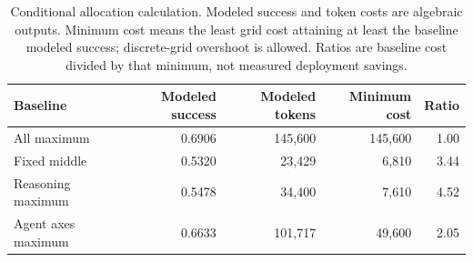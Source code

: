 \begin{table}[t]
\centering\small
\caption{Conditional allocation calculation. Modeled success and token costs are algebraic outputs. Minimum cost means the least grid cost attaining at least the baseline modeled success; discrete-grid overshoot is allowed. Ratios are baseline cost divided by that minimum, not measured deployment savings.}
\label{tab:allocation}
\begin{tabular}{lrrrr}
\toprule
Baseline & Modeled success & Modeled tokens & Minimum cost & Ratio \\
\midrule
All maximum & 0.6906 & 145,600 & 145,600 & 1.00 \\
Fixed middle & 0.5320 & 23,429 & 6,810 & 3.44 \\
Reasoning maximum & 0.5478 & 34,400 & 7,610 & 4.52 \\
Agent axes maximum & 0.6633 & 101,717 & 49,600 & 2.05 \\
\bottomrule
\end{tabular}
\end{table}
